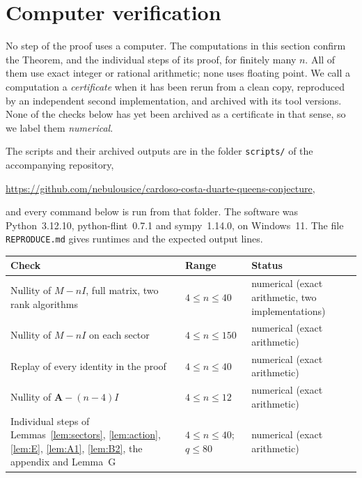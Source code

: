 \documentclass[11pt]{amsart}
\theoremstyle{plain}
\theoremstyle{definition}
\theoremstyle{remark}
\numberwithin{equation}{section}
\newcommand{\Adj}{\mathbf{A}}          %
\begin{document}
\section{Computer verification}\label{sec:computer}

No step of the proof uses a computer. The computations in this section confirm the
Theorem, and the individual steps of its proof, for finitely many \(n\). All of them use
exact integer or rational arithmetic; none uses floating point. We call a computation a
\emph{certificate} when it has been rerun from a clean copy, reproduced by an
independent second implementation, and archived with its tool versions. None of the
checks below has yet been archived as a certificate in that sense, so we label them
\emph{numerical}.

The scripts and their archived outputs are in the folder \nolinkurl{scripts/} of the
accompanying repository,
\begin{center}
\footnotesize\url{https://github.com/nebulousice/cardoso-costa-duarte-queens-conjecture},
\end{center}
and every command below is run from that folder. The software was
Python~3.12.10, python-flint~0.7.1 and sympy~1.14.0, on Windows~11. The file
\nolinkurl{REPRODUCE.md} gives runtimes and the expected output lines.

\begin{center}
\small
\begin{tabular}{@{}>{\raggedright\arraybackslash}p{}%
>{\raggedright\arraybackslash}p{}%
>{\raggedright\arraybackslash}p{}@{}}
\toprule
Check & Range & Status\\
\midrule
Nullity of \(M-nI\), full matrix, two rank algorithms & \(4\le n\le40\) &
numerical (exact arithmetic, two implementations)\\
Nullity of \(M-nI\) on each sector & \(4\le n\le150\) & numerical (exact arithmetic)\\
Replay of every identity in the proof & \(4\le n\le40\) & numerical (exact arithmetic)\\
Nullity of \(\Adj-(n-4)I\) & \(4\le n\le12\) & numerical (exact arithmetic)\\
Individual steps of Lemmas~\ref{lem:sectors}, \ref{lem:action}, \ref{lem:E},
\ref{lem:A1}, \ref{lem:B2}, the appendix and Lemma~G & \(4\le n\le40\);
\(q\le80\) & numerical (exact arithmetic)\\
\bottomrule
\end{tabular}
\end{center}
\end{document}
